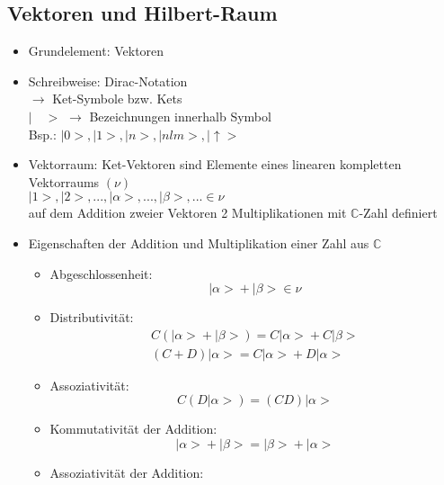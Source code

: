 \documentclass[10pt,article,colorback,accentcolor=tud9d]{scrartcl}
\begin{document}
\subsection{Vektoren und Hilbert-Raum}
\begin{itemize}
\item Grundelement: Vektoren
\item Schreibweise: Dirac-Notation\\
$\rightarrow$ Ket-Symbole bzw. Kets\\
$\left| \quad > \right.$ $\rightarrow$ Bezeichnungen innerhalb Symbol\\
Bsp.: $\left| 0>\right.,\left|1>\right.,\left|n>\right.,\left|nlm>\right.,
\left| \uparrow>\right.$
\item Vektorraum: Ket-Vektoren sind Elemente eines linearen kompletten 
Vektorraums $(\nu)$\\
$\left|1>\right.,\left|2>\right.,...,\left|\alpha>\right.,...,\left|\beta>
\right.,... \in \nu$\\
auf dem Addition zweier Vektoren 2 Multiplikationen mit $\mathbb{C}$-Zahl 
definiert
\item Eigenschaften der Addition und Multiplikation einer Zahl aus $\mathbb{C}$
\begin{fleqn}
\begin{itemize}
\item Abgeschlossenheit: 
\begin{equation} 
\left| \alpha >\right.+\left|\beta>\right. \in \nu
\end{equation}
\item Distributivität: 
\begin{equation}
\begin{aligned}
C(\left|\alpha>\right. +\left|\beta>\right.) = C\left|\alpha>\right. +C\left|
\beta>\right.\\
(C+D)\left|\alpha>\right. = C\left|\alpha>\right. +D\left|\alpha>\right.
\end{aligned}
\end{equation}
\item Assoziativität: 
\begin{equation}
C(D\left|\alpha>\right.)=(CD)\left|\alpha>\right.
\end{equation}
\item Kommutativität der Addition: 
\begin{equation}
\left|\alpha>\right. + \left|\beta>\right. =\left|\beta>\right. + \left|\alpha
>\right.
\end{equation}
\item Assoziativität der Addition: 

\end{itemize}
\end{fleqn}
\end{itemize}
\end{document}
